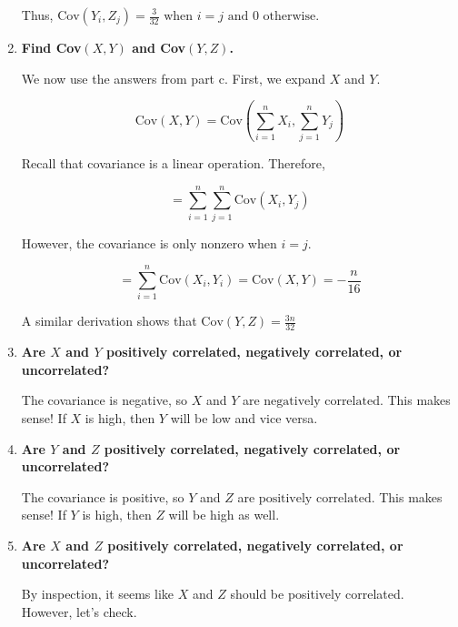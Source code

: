 \documentclass{article}
\begin{document}
\begin{enumerate}[label=(\alph*)]
    Thus, $\boxed{\text{Cov}(Y_i, Z_j) = \frac{3}{32} \text{ when } i = j \text{ and 0 otherwise.}}$

    \vspace{2cm}
    
    \item \textbf{Find Cov$(X, Y)$ and Cov$(Y, Z)$.}
    
    We now use the answers from part c. First, we expand $X$ and $Y$.
    
    $$\text{Cov}(X, Y) = \text{Cov}\left(\sum_{i = 1}^n X_i, \sum_{j = 1}^n Y_j \right)$$
    
    Recall that covariance is a linear operation. Therefore,
    
    $$= \sum_{i = 1}^n \sum_{j = 1}^n \text{Cov}\left(X_i, Y_j \right)$$
    
    However, the covariance is only nonzero when $i = j$.
    
    $$= \sum_{i = 1}^n \text{Cov}\left(X_i, Y_i \right) = \boxed{\text{Cov}(X, Y) = -\frac{n}{16}}$$
    
    A similar derivation shows that $\boxed{\text{Cov}(Y, Z) = \frac{3n}{32}}$

    \vspace{2cm}
    
    \item \textbf{Are $X$ and $Y$ positively correlated, negatively correlated, or uncorrelated?}
    
    The covariance is negative, so $X$ and $Y$ are $\boxed{\text{negatively correlated}}$. This makes sense! If $X$ is high, then $Y$ will be low and vice versa.

    \vspace{2cm}
    
    \item \textbf{Are $Y$ and $Z$ positively correlated, negatively correlated, or uncorrelated?}
    
    The covariance is positive, so $Y$ and $Z$ are $\boxed{\text{positively correlated}}$. This makes sense! If $Y$ is high, then $Z$ will be high as well.

    \vspace{2cm}
    
    \item \textbf{Are $X$ and $Z$ positively correlated, negatively correlated, or uncorrelated?}
    
    By inspection, it seems like $X$ and $Z$ should be positively correlated. However, let's check.
    

\end{enumerate}
\end{document}
